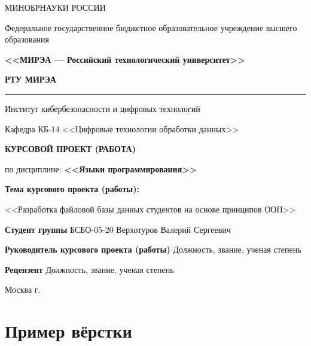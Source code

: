 \documentclass[14pt, a4paper, titlepage]{extarticle}
\begin{document}
\begin{titlepage}
    \begin{center}
        \vspace*{2cm} %
        МИНОБРНАУКИ РОССИИ\par 
        Федеральное государственное бюджетное образовательное учреждение высшего образования\par
        \textbf{<<МИРЭА --- Российский технологический университет>>}\par
        \textbf{РТУ МИРЭА}
        \rule{\textwidth}{1pt}
        Институт кибербезопасности и цифровых технологий\par
        Кафедра КБ-14 <<Цифровые технологии обработки данных>>\par
        \fontsize{16pt}{16pt}\selectfont
        \textbf{КУРСОВОЙ ПРОЕКТ (РАБОТА)} \par \bigskip по дисциплине: \textbf{<<Языки программирования>>}\par
        \bigskip 
        \textbf{Тема курсового проекта (работы):} \par
        <<Разработка файловой базы данных студентов на основе принципов ООП>>\par
    \end{center}
    \noindent\textbf{Студент группы} {\fontsize{16pt}{16pt}\selectfont БСБО-05-20 Верхотуров Валерий Сергеевич}\par
    \noindent\textbf{Руководитель курсового проекта (работы)} {\fontsize{16pt}{16pt}\selectfont Должность, звание, ученая степень}\par
    \noindent\textbf{Рецензент} {\fontsize{16pt}{16pt}\selectfont Должность, звание, ученая степень}\par
    \centering\vfill 
    Москва \the\year{} г.
\end{titlepage}

\tableofcontents
\newpage

\section{Пример вёрстки}
\end{document}
